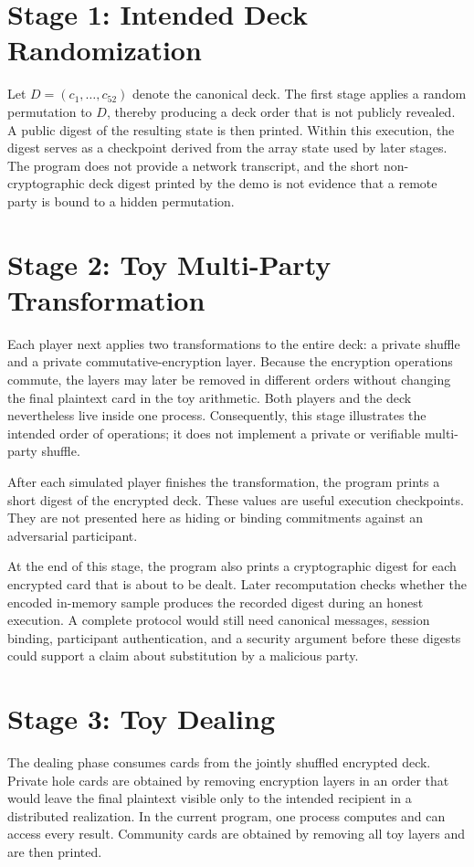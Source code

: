 \section{Stage 1: Intended Deck Randomization}
Let \(D = (c_1,\dots,c_{52})\) denote the canonical deck. The first stage
applies a random permutation to \(D\), thereby producing a deck order that is
not publicly revealed. A public digest of the resulting state is then
printed.  Within this execution, the digest serves as a checkpoint derived
from the array state used by later stages.  The program does not provide a
network transcript, and the
short non-cryptographic deck digest printed by the demo is not evidence that a
remote party is bound to a hidden permutation.

\section{Stage 2: Toy Multi-Party Transformation}
Each player next applies two transformations to the entire deck: a private
shuffle and a private commutative-encryption layer. Because the encryption
operations commute, the layers may later be removed in different orders
without changing the final plaintext card in the toy arithmetic.  Both players
and the deck nevertheless live inside one process.  Consequently, this stage
illustrates the intended order of operations; it does not implement a private
or verifiable multi-party shuffle.

After each simulated player finishes the transformation, the program prints a
short digest of the encrypted deck.  These values are useful execution
checkpoints.  They are not presented here as hiding or binding commitments
against an adversarial participant.

At the end of this stage, the program also prints a cryptographic digest for
each encrypted card that is about to be dealt.  Later recomputation checks
whether the encoded in-memory sample produces the recorded digest during an
honest execution.  A
complete protocol would still need canonical messages, session binding,
participant authentication, and a security argument before these digests could
support a claim about substitution by a malicious party.

\section{Stage 3: Toy Dealing}
The dealing phase consumes cards from the jointly shuffled encrypted deck.
Private hole cards are obtained by removing encryption layers in an order that
would leave the final plaintext visible only to the intended recipient in a
distributed realization.  In the current program, one process computes and can
access every result.  Community cards are obtained by removing all toy layers
and are then printed.

